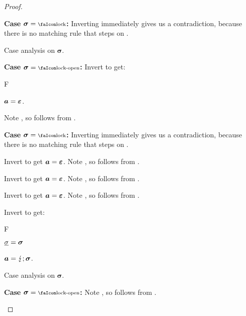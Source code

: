 \documentclass[a4paper,names,dvipsnames]{article}
\begin{document}
\begin{proof}
\begin{description}
\begin{description}
\begin{description}
            \item \textbf{Case }$\bm{\sigma}=\lock$\textbf{:}
              Inverting  immediately gives us a contradiction, because there is no matching rule that steps on \lock.
          \end{description}

          Case analysis on $\bm{\sigma}$.
          \begin{description}
            \item \textbf{Case }$\bm{\sigma}=\unlock$\textbf{:}
              Invert  to get:
              \begin{passumptions}{F}
                \item $\bm{a}=\bm{\varepsilon}$.
              \end{passumptions}
              Note , so  follows from .

            \item \textbf{Case }$\bm{\sigma}=\lock$\textbf{:}
              Inverting  immediately gives us a contradiction, because there is no matching rule that steps on \lock.
          \end{description}

          Invert  to get $\bm{a}=\bm{\varepsilon}$.
          Note , so  follows from .

          Invert  to get $\bm{a}=\bm{\varepsilon}$.
          Note , so  follows from .

          Invert  to get $\bm{a}=\bm{\varepsilon}$.
          Note , so  follows from .

          Invert  to get:
          \begin{passumptions}{F}
            \item $\underline{\sigma}=\bm{\sigma}$
            \item $\bm{a}=\bm{\lightning};\bm{\sigma}$.
          \end{passumptions}
          Case analysis on $\bm{\sigma}$.
          \begin{description}
            \item \textbf{Case }$\bm{\sigma}=\unlock$\textbf{:}
              Note , so  follows from .


\end{description}
\end{description}
\end{description}
\end{proof}
\end{document}
